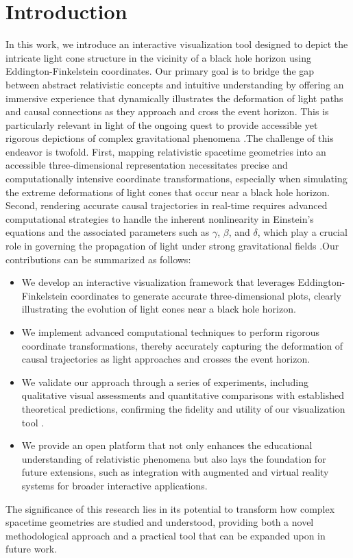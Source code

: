 \documentclass{article}
\begin{document}
\section{Introduction}\n \n In this work, we introduce an interactive visualization tool designed to depict the intricate light cone structure in the vicinity of a black hole horizon using Eddington-Finkelstein coordinates. Our primary goal is to bridge the gap between abstract relativistic concepts and intuitive understanding by offering an immersive experience that dynamically illustrates the deformation of light paths and causal connections as they approach and cross the event horizon. This is particularly relevant in light of the ongoing quest to provide accessible yet rigorous depictions of complex gravitational phenomena \cite{Reference1,Reference2}.\n \n The challenge of this endeavor is twofold. First, mapping relativistic spacetime geometries into an accessible three-dimensional representation necessitates precise and computationally intensive coordinate transformations, especially when simulating the extreme deformations of light cones that occur near a black hole horizon. Second, rendering accurate causal trajectories in real-time requires advanced computational strategies to handle the inherent nonlinearity in Einstein's equations and the associated parameters such as $\gamma$, $\beta$, and $\delta$, which play a crucial role in governing the propagation of light under strong gravitational fields \cite{Reference3}.\n \n Our contributions can be summarized as follows:\n \begin{itemize}\n   \item We develop an interactive visualization framework that leverages Eddington-Finkelstein coordinates to generate accurate three-dimensional plots, clearly illustrating the evolution of light cones near a black hole horizon.\n   \item We implement advanced computational techniques to perform rigorous coordinate transformations, thereby accurately capturing the deformation of causal trajectories as light approaches and crosses the event horizon.\n   \item We validate our approach through a series of experiments, including qualitative visual assessments and quantitative comparisons with established theoretical predictions, confirming the fidelity and utility of our visualization tool \cite{Reference4}.\n   \item We provide an open platform that not only enhances the educational understanding of relativistic phenomena but also lays the foundation for future extensions, such as integration with augmented and virtual reality systems for broader interactive applications.\n \end{itemize}\n \n The significance of this research lies in its potential to transform how complex spacetime geometries are studied and understood, providing both a novel methodological approach and a practical tool that can be expanded upon in future work.
\end{document}
